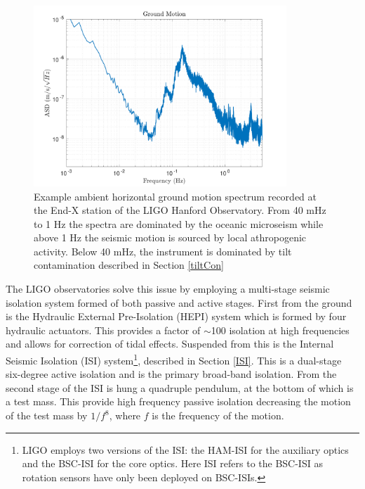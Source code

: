 \documentclass [12pt, proquest]{uwthesis}[2019]
\begin{document}
\begin{figure}[!h]
\begin{center}
\includegraphics[width=0.85\textwidth]{GroundSpectrum.pdf}
\caption[Example ambient ground motion spectrum]{Example ambient horizontal ground motion spectrum recorded at the End-X station of the LIGO Hanford Observatory. From 40 mHz to 1 Hz the spectra are dominated by the oceanic microseism while above 1 Hz the seismic motion is sourced by local athropogenic activity. Below 40 mHz, the instrument is dominated by tilt contamination described in Section \ref{tiltCon}}
\label{groundSpec}
\end{center}
\end{figure}

The LIGO observatories solve this issue by employing a multi-stage seismic isolation system formed of both passive and active stages. \cite{ligoSeis} First from the ground is the Hydraulic External Pre-Isolation (HEPI) system which is formed by four hydraulic actuators. This provides a factor of $\sim$100 isolation at high frequencies and allows for correction of tidal effects. Suspended from this is the Internal Seismic Isolation (ISI) system\footnote{LIGO employs two versions of the ISI: the HAM-ISI for the auxiliary optics and the BSC-ISI for the core optics. Here ISI refers to the BSC-ISI as rotation sensors have only been deployed on BSC-ISIs.}, described in Section \ref{ISI}. This is a dual-stage six-degree active isolation and is the primary broad-band isolation. From the second stage of the ISI is hung a quadruple pendulum, at the bottom of which is a test mass. This provide high frequency passive isolation decreasing the motion of the test mass by $1/f^8$, where $f$ is the frequency of the motion.
\end{document}
